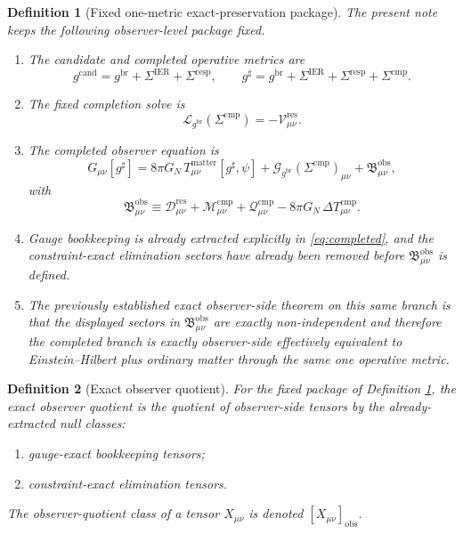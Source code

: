 \documentclass[11pt]{article}
\newcommand{\ObserverMetric}{g^{\mathrm{br}}}
\newcommand{\CandidateMetric}{g^{\mathrm{cand}}}
\newcommand{\CompletedMetric}{g^{\sharp}}
\newcommand{\BaseShift}{\Sigma^{\mathrm{IER}}}
\newcommand{\ResponseShift}{\Sigma^{\mathrm{resp}}}
\newcommand{\CompShift}{\Sigma^{\mathrm{cmp}}}
\newcommand{\ResidualCore}{\mathcal V_{\mu\nu}^{\mathrm{res}}}
\newcommand{\ResidualDec}{\mathcal D_{\mu\nu}^{\mathrm{res}}}
\newcommand{\ReducedEin}{\mathcal L_{\ObserverMetric}}
\newcommand{\GaugeBook}{\mathcal G_{\ObserverMetric}}
\newcommand{\CompMix}{\mathcal M_{\mu\nu}^{\mathrm{cmp}}}
\newcommand{\CompQuad}{\mathcal Q_{\mu\nu}^{\mathrm{cmp}}}
\newcommand{\DeltaTComp}{\Delta T_{\mu\nu}^{\mathrm{cmp}}}
\newcommand{\ObsBurden}{\mathfrak B_{\mu\nu}^{\mathrm{obs}}}
\newcommand{\ObserverClass}[1]{\left[#1\right]_{\mathrm{obs}}}
\newtheorem{definition}{Definition}
\begin{document}
\begin{definition}[Fixed one-metric exact-preservation package]
\label{def:fixed}
The present note keeps the following observer-level package fixed.
\begin{enumerate}
    \item The candidate and completed operative metrics are
    \begin{equation}
    \CandidateMetric
    =
    \ObserverMetric+\BaseShift+\ResponseShift,
    \qquad
    \CompletedMetric
    =
    \ObserverMetric+\BaseShift+\ResponseShift+\CompShift.
    \label{eq:metrics}
    \end{equation}
    \item The fixed completion solve is
    \begin{equation}
    \ReducedEin(\CompShift)=-\ResidualCore.
    \label{eq:solve}
    \end{equation}
    \item The completed observer equation is
    \begin{equation}
    G_{\mu\nu}[\CompletedMetric]
    =
    8\pi G_N\,T_{\mu\nu}^{\mathrm{matter}}[\CompletedMetric,\psi]
    +\GaugeBook(\CompShift)_{\mu\nu}
    +\ObsBurden,
    \label{eq:completed}
    \end{equation}
    with
    \begin{equation}
    \ObsBurden
    \equiv
    \ResidualDec+\CompMix+\CompQuad-8\pi G_N\,\DeltaTComp.
    \label{eq:burden}
    \end{equation}
    \item Gauge bookkeeping is already extracted explicitly in \eqref{eq:completed}, and the constraint-exact elimination sectors have already been removed before \(\ObsBurden\) is defined.
    \item The previously established exact observer-side theorem on this same branch is that the displayed sectors in \(\ObsBurden\) are exactly non-independent and therefore the completed branch is exactly observer-side effectively equivalent to Einstein--Hilbert plus ordinary matter through the same one operative metric.
\end{enumerate}
\end{definition}

\begin{definition}[Exact observer quotient]
\label{def:quot}
For the fixed package of Definition \ref{def:fixed}, the \emph{exact observer quotient} is the quotient of observer-side tensors by the already-extracted null classes:
\begin{enumerate}
    \item gauge-exact bookkeeping tensors;
    \item constraint-exact elimination tensors.
\end{enumerate}
The observer-quotient class of a tensor \(X_{\mu\nu}\) is denoted \(\ObserverClass{X_{\mu\nu}}\).
\end{definition}
\end{document}
